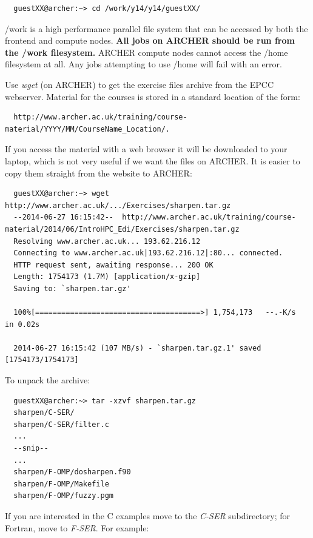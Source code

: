 \documentclass{article}
\begin{document}
\begin{verbatim}
  guestXX@archer:~> cd /work/y14/y14/guestXX/
\end{verbatim}

/work is a high performance parallel file system that can be accessed
by both the frontend and compute nodes. \textbf{All jobs on ARCHER
  should be run from the /work filesystem.} ARCHER compute nodes
cannot access the /home filesystem at all. Any jobs attempting to use
/home will fail with an error.

Use \emph{wget} (on ARCHER) to get the exercise files archive from the
EPCC webserver. Material for the courses is stored in a standard
location of the form:

\begin{verbatim}
  http://www.archer.ac.uk/training/course-material/YYYY/MM/CourseName_Location/.
\end{verbatim}

If you access the material with a web browser it will be
downloaded to your laptop, which is not very useful if we want the
files on ARCHER. It is easier to copy them straight from the
website to ARCHER:

\begin{verbatim}
  guestXX@archer:~> wget http://www.archer.ac.uk/.../Exercises/sharpen.tar.gz
  --2014-06-27 16:15:42--  http://www.archer.ac.uk/training/course-material/2014/06/IntroHPC_Edi/Exercises/sharpen.tar.gz
  Resolving www.archer.ac.uk... 193.62.216.12
  Connecting to www.archer.ac.uk|193.62.216.12|:80... connected.
  HTTP request sent, awaiting response... 200 OK
  Length: 1754173 (1.7M) [application/x-gzip]
  Saving to: `sharpen.tar.gz'

  100%[======================================>] 1,754,173   --.-K/s   in 0.02s   

  2014-06-27 16:15:42 (107 MB/s) - `sharpen.tar.gz.1' saved [1754173/1754173]
\end{verbatim}

To unpack the archive:

\begin{verbatim}
  guestXX@archer:~> tar -xzvf sharpen.tar.gz
  sharpen/C-SER/
  sharpen/C-SER/filter.c
  ...
  --snip--
  ...
  sharpen/F-OMP/dosharpen.f90
  sharpen/F-OMP/Makefile
  sharpen/F-OMP/fuzzy.pgm
\end{verbatim}

 If you are interested in the C examples move to the
\emph{C-SER} subdirectory; for Fortran, move to \emph{F-SER}. For example:
\end{document}
